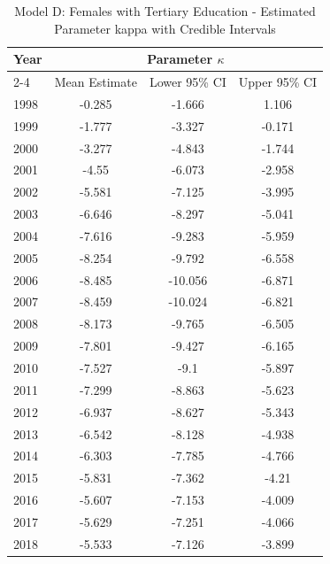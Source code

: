 \begin{landscape}
\begin{table}[htbp]
\centering
\caption{Model D: Females with Tertiary Education - Estimated Parameter kappa  with Credible Intervals}
\label{tab:parameters_k28}
\begin{tabular}{@{}lccc@{}}
\toprule
Year & \multicolumn{3}{c}{Parameter \(\kappa\)} \\
\cmidrule(lr){2-4}
      & Mean Estimate & Lower 95\% CI & Upper 95\% CI \\
\midrule
1998 & -0.285 & -1.666 & 1.106 \\
1999 & -1.777 & -3.327 & -0.171 \\
2000 & -3.277 & -4.843 & -1.744 \\
2001 & -4.55 & -6.073 & -2.958 \\
2002 & -5.581 & -7.125 & -3.995 \\
2003 & -6.646 & -8.297 & -5.041 \\
2004 & -7.616 & -9.283 & -5.959 \\
2005 & -8.254 & -9.792 & -6.558 \\
2006 & -8.485 & -10.056 & -6.871 \\
2007 & -8.459 & -10.024 & -6.821 \\
2008 & -8.173 & -9.765 & -6.505 \\
2009 & -7.801 & -9.427 & -6.165 \\
2010 & -7.527 & -9.1 & -5.897 \\
2011 & -7.299 & -8.863 & -5.623 \\
2012 & -6.937 & -8.627 & -5.343 \\
2013 & -6.542 & -8.128 & -4.938 \\
2014 & -6.303 & -7.785 & -4.766 \\
2015 & -5.831 & -7.362 & -4.21 \\
2016 & -5.607 & -7.153 & -4.009 \\
2017 & -5.629 & -7.251 & -4.066 \\
2018 & -5.533 & -7.126 & -3.899 \\
\bottomrule
\end{tabular}
\end{table}
\end{landscape}